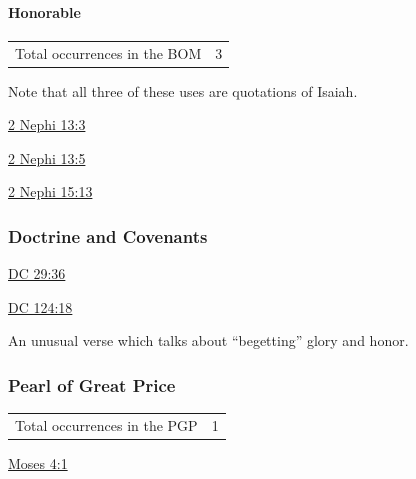 		\paragraph{Honorable}
	
			\begin{tabular}{ll}
				Total occurrences in the BOM & 3
			\end{tabular}
			
			Note that all three of these uses are quotations of Isaiah.
			
			\begin{compactdesc}
				\item[{\hyperref[2NEPHI-13-3]{2 Nephi 13:3}}]
				\item[{\hyperref[2NEPHI-13-5]{2 Nephi 13:5}}]
				\item[{\hyperref[2NEPHI-15-13]{2 Nephi 15:13}}]
			\end{compactdesc}
		
	\subsubsection{Doctrine and Covenants} %
		\label{HONOR-DC}
	
		
		\begin{compactdesc}
			\item[{\hyperref[DC29-36]{DC 29:36}}]
			\item[{\hyperref[DC124-18]{DC 124:18}}] \phantom{.}
				\begin{compactitem}
					\item An unusual verse which talks about ``begetting'' glory and honor.
				\end{compactitem}
		\end{compactdesc}
		
	\subsubsection{Pearl of Great Price} %
		\label{HONOR-PGP}
	
		\begin{tabular}{ll}
			Total occurrences in the PGP & 1
		\end{tabular}
		
		\begin{compactdesc}
			\item[{\hyperref[MOSES-4-1]{Moses 4:1}}]
		\end{compactdesc}
		
